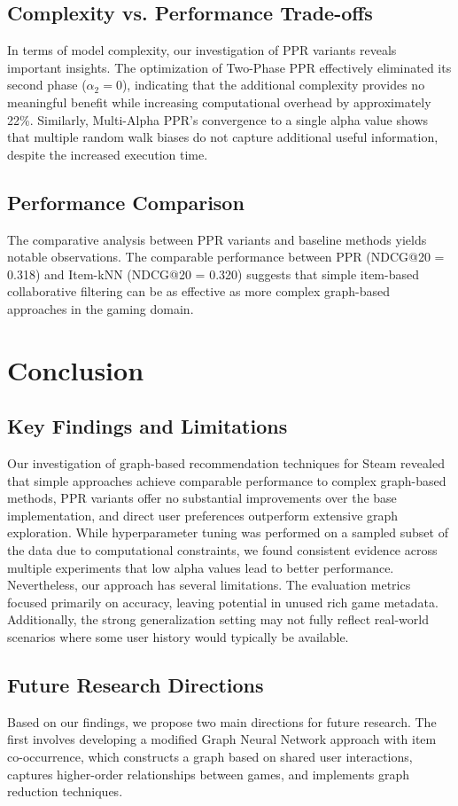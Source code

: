 \documentclass[conference,compsoc]{IEEEtran}
\begin{document}
\subsection{Complexity vs. Performance Trade-offs}
In terms of model complexity, our investigation of PPR variants reveals important insights. The optimization of Two-Phase PPR effectively eliminated its second phase ($\alpha_2 = 0$), indicating that the additional complexity provides no meaningful benefit while increasing computational overhead by approximately 22\%. Similarly, Multi-Alpha PPR's convergence to a single alpha value shows that multiple random walk biases do not capture additional useful information, despite the increased execution time.

\subsection{Performance Comparison}
The comparative analysis between PPR variants and baseline methods yields notable observations. The comparable performance between PPR (NDCG@20 = 0.318) and Item-kNN (NDCG@20 = 0.320) suggests that simple item-based collaborative filtering can be as effective as more complex graph-based approaches in the gaming domain.

\section{Conclusion}
\subsection{Key Findings and Limitations}
Our investigation of graph-based recommendation techniques for Steam revealed that simple approaches achieve comparable performance to complex graph-based methods, PPR variants offer no substantial improvements over the base implementation, and direct user preferences outperform extensive graph exploration.
While hyperparameter tuning was performed on a sampled subset of the data due to computational constraints, we found consistent evidence across multiple experiments that low alpha values lead to better performance. Nevertheless, our approach has several limitations. The evaluation metrics focused primarily on accuracy, leaving potential in unused rich game metadata. Additionally, the strong generalization setting may not fully reflect real-world scenarios where some user history would typically be available.

\subsection{Future Research Directions}
Based on our findings, we propose two main directions for future research. The first involves developing a modified Graph Neural Network approach with item co-occurrence, which constructs a graph based on shared user interactions, captures higher-order relationships between games, and implements graph reduction techniques.
\end{document}

